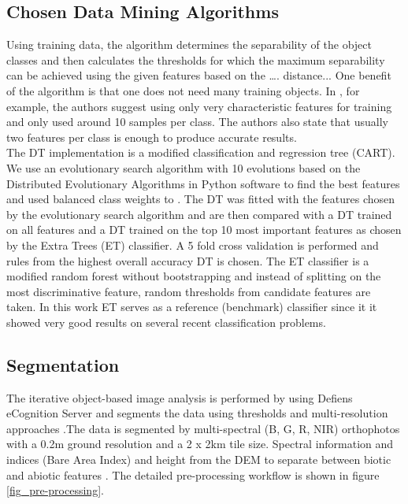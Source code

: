 \documentclass[authoryear, review,12pt,number]{elsarticle}
\begin{document}
\subsection{Chosen Data Mining Algorithms}
Using training data, the algorithm determines the separability of the object classes and then
calculates the thresholds for which the maximum separability can be achieved
using the given features based on the 
\ldots. distance...
One benefit of the algorithm is that one does not need many training objects. In
\cite{Nussbaum2006}, for example, the authors suggest using only very
characteristic features for training and only used around 10 samples per
class. The authors also state that usually two features
per class is enough to produce accurate results.\\
The DT implementation is a modified classification and
regression tree (CART)\citep{scikit-learn}. We use an evolutionary search 
algorithm with 10 evolutions based on the Distributed Evolutionary Algorithms 
in Python \citep{DEAP_JMLR2012} software to find the best features and used 
balanced class weights to . The 
DT was fitted with the features chosen by the evolutionary search algorithm and
are then compared with a DT trained on all features and 
a DT trained on the top 10 most important features as chosen by the Extra 
Trees (ET) classifier. A 5 fold cross validation is performed and rules from 
the highest overall accuracy DT is chosen. The ET classifier is a modified 
random forest without bootstrapping and instead of splitting on the most 
discriminative feature, random thresholds from candidate features are taken.
In this work ET serves as a reference (benchmark) classifier since it it showed
very good results on several recent classification problems. 
\subsection{Segmentation} 
\label{subsec_segmentation}
The iterative object-based image analysis is performed by \cite{Tintrup2015}
using Defiens eCognition Server and segments the data using thresholds and multi-resolution approaches 
\citep{baatz2001ecognition}.The data is segmented by
multi-spectral (B, G, R, NIR) orthophotos with a 0.2m ground resolution and a 2
x 2km tile size. Spectral information and indices (Bare Area Index) and
height from the DEM to separate between biotic and
abiotic features \citep{Tintrup2015}. The detailed pre-processing workflow is
shown in figure \ref{fig_pre-processing}.
\end{document}
